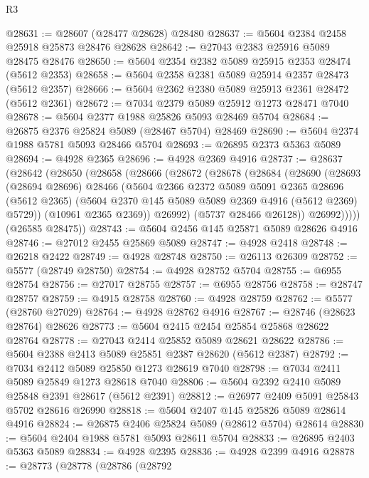 \begin{lexlean}{R3}
\begin{coremodule}
@28631 := @28607 (@28477 @28628) @28480
@28637 := @5604 @2384 @2458 @25918 @25873 @28476 @28628
@28642 := @27043 @2383 @25916 @5089 @28475 @28476
@28650 := @5604 @2354 @2382 @5089 @25915 @2353 @28474 (@5612 @2353)
@28658 := @5604 @2358 @2381 @5089 @25914 @2357 @28473 (@5612 @2357)
@28666 := @5604 @2362 @2380 @5089 @25913 @2361 @28472 (@5612 @2361)
@28672 := @7034 @2379 @5089 @25912 @1273 @28471 @7040
@28678 := @5604 @2377 @1988 @25826 @5093 @28469 @5704
@28684 := @26875 @2376 @25824 @5089 (@28467 @5704) @28469
@28690 := @5604 @2374 @1988 @5781 @5093 @28466 @5704
@28693 := @26895 @2373 @5363 @5089
@28694 := @4928 @2365
@28696 := @4928 @2369 @4916
@28737 := @28637
    (@28642
      (@28650
        (@28658
          (@28666
            (@28672
              (@28678
                (@28684
                  (@28690
                    (@28693
                      (@28694 @28696)
                      @28466
                      (@5604
                        @2366
                        @2372
                        @5089
                        @5091
                        @2365
                        @28696
                        (@5612 @2365)
                        (@5604 @2370 @145 @5089 @5089 @2369 @4916 (@5612 @2369) @5729))
                      (@10961 @2365 @2369))
                    @26992)
                  (@5737 @28466 @26128))
                @26992)))))
      (@26585 @28475))
@28743 := @5604 @2456 @145 @25871 @5089 @28626 @4916
@28746 := @27012 @2455 @25869 @5089
@28747 := @4928 @2418
@28748 := @26218 @2422
@28749 := @4928 @28748
@28750 := @26113 @26309
@28752 := @5577 (@28749 @28750)
@28754 := @4928 @28752 @5704
@28755 := @6955 @28754
@28756 := @27017 @28755
@28757 := @6955 @28756
@28758 := @28747 @28757
@28759 := @4915 @28758
@28760 := @4928 @28759
@28762 := @5577 (@28760 @27029)
@28764 := @4928 @28762 @4916
@28767 := @28746 (@28623 @28764) @28626
@28773 := @5604 @2415 @2454 @25854 @25868 @28622 @28764
@28778 := @27043 @2414 @25852 @5089 @28621 @28622
@28786 := @5604 @2388 @2413 @5089 @25851 @2387 @28620 (@5612 @2387)
@28792 := @7034 @2412 @5089 @25850 @1273 @28619 @7040
@28798 := @7034 @2411 @5089 @25849 @1273 @28618 @7040
@28806 := @5604 @2392 @2410 @5089 @25848 @2391 @28617 (@5612 @2391)
@28812 := @26977 @2409 @5091 @25843 @5702 @28616 @26990
@28818 := @5604 @2407 @145 @25826 @5089 @28614 @4916
@28824 := @26875 @2406 @25824 @5089 (@28612 @5704) @28614
@28830 := @5604 @2404 @1988 @5781 @5093 @28611 @5704
@28833 := @26895 @2403 @5363 @5089
@28834 := @4928 @2395
@28836 := @4928 @2399 @4916
@28878 := @28773
    (@28778
      (@28786
        (@28792

\end{coremodule}
\end{lexlean}
